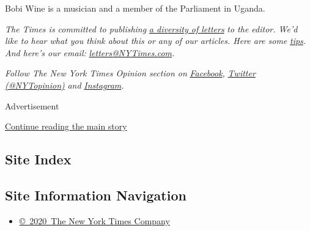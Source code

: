 Bobi Wine is a musician and a member of the Parliament in Uganda.

\emph{The Times is committed to publishing}
\href{https://www.nytimes3xbfgragh.onion/2019/01/31/opinion/letters/letters-to-editor-new-york-times-women.html}{\emph{a
diversity of letters}} \emph{to the editor. We'd like to hear what you
think about this or any of our articles. Here are some}
\href{https://help.nytimes3xbfgragh.onion/hc/en-us/articles/115014925288-How-to-submit-a-letter-to-the-editor}{\emph{tips}}\emph{.
And here's our email:}
\href{mailto:letters@NYTimes.com}{\emph{letters@NYTimes.com}}\emph{.}

\emph{Follow The New York Times Opinion section on}
\href{https://www.facebookcorewwwi.onion/nytopinion}{\emph{Facebook}}\emph{,}
\href{http://twitter.com/NYTOpinion}{\emph{Twitter (@NYTopinion)}}
\emph{and}
\href{https://www.instagram.com/nytopinion/}{\emph{Instagram}}\emph{.}

Advertisement

\protect\hyperlink{after-bottom}{Continue reading the main story}

\hypertarget{site-index}{%
\subsection{Site Index}\label{site-index}}

\hypertarget{site-information-navigation}{%
\subsection{Site Information
Navigation}\label{site-information-navigation}}

\begin{itemize}
\tightlist
\item
  \href{https://help.nytimes3xbfgragh.onion/hc/en-us/articles/115014792127-Copyright-notice}{©~2020~The
  New York Times Company}
\end{itemize}

